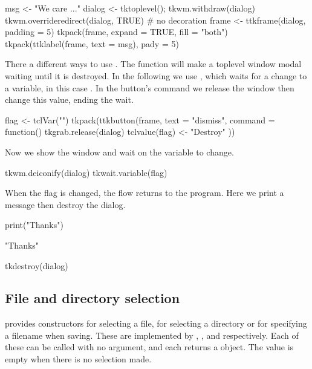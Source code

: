 \begin{Schunk}
\begin{Sinput}
 msg <- "We care ..."
 dialog <- tktoplevel(); tkwm.withdraw(dialog)
 tkwm.overrideredirect(dialog, TRUE)   # no decoration
 frame <- ttkframe(dialog, padding = 5)
 tkpack(frame, expand = TRUE, fill = "both")
 tkpack(ttklabel(frame, text = msg), pady = 5)
\end{Sinput}
\end{Schunk}

There a different ways to use . The function
 will make a toplevel window modal waiting
until it is destroyed. In the following we use
, which waits for a change to a variable, in
this case .  In the button's command we release the window
then change this value, ending the wait.
\begin{Schunk}
\begin{Sinput}
 flag <- tclVar("")
 tkpack(ttkbutton(frame, text = "dismiss", command = function() {
   tkgrab.release(dialog)
   tclvalue(flag) <- "Destroy"
 }))
\end{Sinput}
\end{Schunk}
Now we show the window and wait on the  variable to change.
\begin{Schunk}
\begin{Sinput}
 tkwm.deiconify(dialog)
 tkwait.variable(flag)
\end{Sinput}
\end{Schunk}

When the flag is changed, the flow returns to the program. Here we
print a message then destroy the dialog.
\begin{Schunk}
\begin{Sinput}
 print("Thanks")
\end{Sinput}
\begin{Soutput}
[1] "Thanks"
\end{Soutput}
\begin{Sinput}
 tkdestroy(dialog)
\end{Sinput}
\end{Schunk}


\subsection{File and directory selection}
\label{sec:file-direct-select}

\Tk\/ provides constructors for selecting a file, for selecting a
directory or for specifying a filename when saving. These are
implemented by ,
, and 
respectively. Each of these can be called with no argument, and
each returns a  object. The value is empty when there is no selection made.

